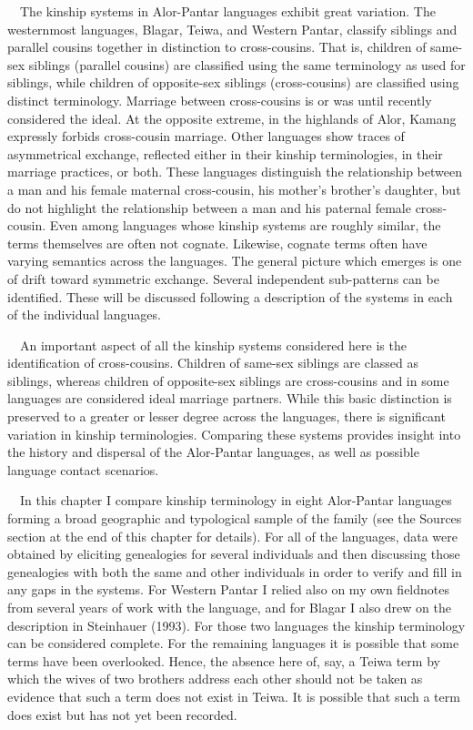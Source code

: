 \ \ The kinship systems in Alor-Pantar languages exhibit great variation. The westernmost languages, Blagar, Teiwa, and Western Pantar, classify siblings and parallel cousins together in distinction to cross-cousins. That is, children of same-sex siblings (parallel cousins) are classified using the same terminology as used for siblings, while children of opposite-sex siblings (cross-cousins) are classified using distinct terminology. Marriage between cross-cousins is or was until recently considered the ideal. At the opposite extreme, in the highlands of Alor, Kamang expressly forbids cross-cousin marriage. Other languages show traces of asymmetrical exchange, reflected either in their kinship terminologies, in their marriage practices, or both. These languages distinguish the relationship between a man and his female maternal cross-cousin, his mother{\textquoteright}s brother{\textquoteright}s daughter, but do not highlight the relationship between a man and his paternal female cross-cousin. Even among 
languages whose kinship systems are roughly similar, the terms themselves are often not cognate. Likewise, cognate terms often have varying semantics across the languages. The general picture which emerges is one of drift toward symmetric exchange. Several independent sub-patterns can be identified. These will be discussed following a description of the systems in each of the individual languages.

\ \ An important aspect of all the kinship systems considered here is the identification of cross-cousins. Children of same-sex siblings are classed as siblings, whereas children of opposite-sex siblings are cross-cousins and in some languages are considered ideal marriage partners. While this basic distinction is preserved to a greater or lesser degree across the languages, there is significant variation in kinship terminologies. Comparing these systems provides insight into the history and dispersal of the Alor-Pantar languages, as well as possible language contact scenarios.

\ \ In this chapter I compare kinship terminology in eight Alor-Pantar languages forming a broad geographic and typological sample of the family (see the Sources section at the end of this chapter for details). For all of the languages, data were obtained by eliciting genealogies for several individuals and then discussing those genealogies with both the same and other individuals in order to verify and fill in any gaps in the systems. For Western Pantar I relied also on my own fieldnotes from several years of work with the language, and for Blagar I also drew on the description in Steinhauer (1993). For those two languages the kinship terminology can be considered complete. For the remaining languages it is possible that some terms have been overlooked. Hence, the absence here of, say, a Teiwa term by which the wives of two brothers address each other should not be taken as evidence that such a term does not exist in Teiwa. It is possible that such a term does exist but has not yet been recorded.


